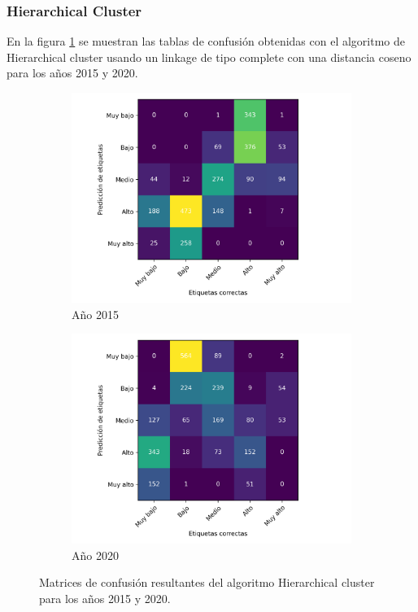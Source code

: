 \pagebreak
\subsubsection{Hierarchical Cluster}

En la figura \ref{fig:cluster} se muestran las tablas de confusión obtenidas con el algoritmo de Hierarchical cluster usando un linkage de tipo complete con una distancia coseno para los años 2015 y 2020.

\begin{figure}[H]
    \centering
    \begin{subfigure}{8.4cm}
        \includegraphics[width=1\linewidth]{Graphics/Data_2015/Cluster_confusion_matrix.png}
        \caption{Año 2015}
    \end{subfigure}
    \begin{subfigure}{8.4cm}
        \includegraphics[width=1\linewidth]{Graphics/Data_2020/Cluster_confusion_matrix.png}
        \caption{Año 2020}
    \end{subfigure}
    \caption{Matrices de confusión resultantes del algoritmo Hierarchical cluster para los años 2015 y 2020.}
    \label{fig:cluster}
\end{figure}